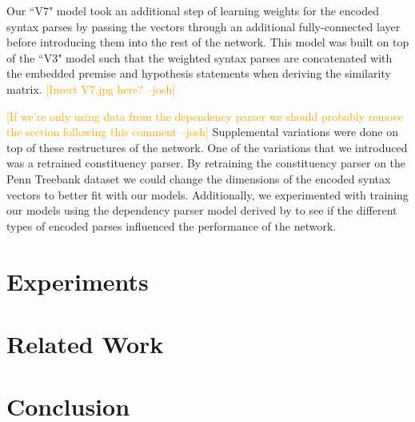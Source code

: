 \documentclass[11pt,a4paper]{article}
\newcommand{\jbcomment}[1]{\textcolor{orange}{[#1 --josh]}}
\begin{document}
Our ``V7" model took an additional step of learning weights for the encoded syntax 
parses by passing the vectors through an additional fully-connected layer before 
introducing them into the rest of the network. This model was built on top of the 
``V3" model such that the weighted syntax parses are concatenated with the embedded 
premise and hypothesis statements when deriving the similarity matrix. \jbcomment{Insert V7.jpg here?}

\jbcomment{If we're only using data from the dependency parser we should probably 
remove the section following this comment}
Supplemental variations were done on top of these restructures of the network. One 
of the variations that we introduced was a retrained constituency parser. By 
retraining the constituency parser on the Penn Treebank dataset \citep{marcus1993building} 
we could change the dimensions of the encoded syntax vectors to better fit with our models. 
Additionally, we experimented with training our models using the dependency parser model 
derived by \citet{Dozat2016-gs} to see if the different types of encoded parses influenced 
the performance of the network.

\section{Experiments}



\section{Related Work}

\section{Conclusion}



\end{document}
